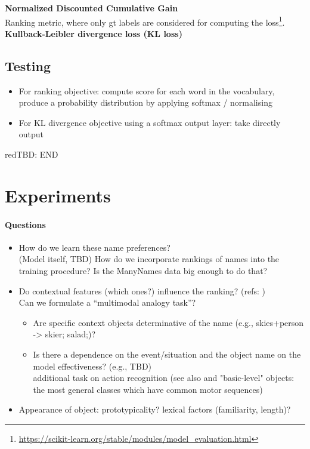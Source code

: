 \documentclass[11pt,a4paper]{article}
\newcommand{\tbd}[1]{\begin{color}{red}TBD: #1\end{color}\xspace}
\begin{document}
\textbf{Normalized Discounted Cumulative Gain}\\
Ranking metric, where only gt labels are considered for computing the loss\footnote{\url{https://scikit-learn.org/stable/modules/model_evaluation.html}}.\\

\textbf{Kullback-Leibler divergence loss (KL loss)}\\

\subsection{Testing}
\begin{itemize}
	\item For ranking objective: compute score for each word in the vocabulary, produce a probability distribution by applying softmax / normalising
	\item For KL divergence objective using a softmax output layer: take directly  output
\end{itemize}
\tbd{END}

\section{Experiments}
\label{sec:experiments}

\paragraph{Questions}
\begin{itemize}
	\item How do we learn these  name preferences?\\
	 (Model itself, TBD) How do we incorporate rankings of names into the training procedure? Is the ManyNames data big enough to do that?
	\item Do contextual features (which ones?) influence the ranking? (refs: \citealp{murphy1989categorizing})\\
	Can we formulate a ``multimodal analogy task''?
	\begin{itemize}
		\item Are specific context objects determinative of the name (e.g., skies+person -> skier; salad;)?
		\item Is there a dependence on the event/situation and the object name on the model effectiveness?  (e.g., TBD)\\
		additional task on action recognition (see also  and "basic-level" objects: the most general classes which have common motor sequences)
	\end{itemize}
	\item Appearance of object: prototypicality? lexical factors (familiarity, length)?
\end{itemize}
\end{document}
